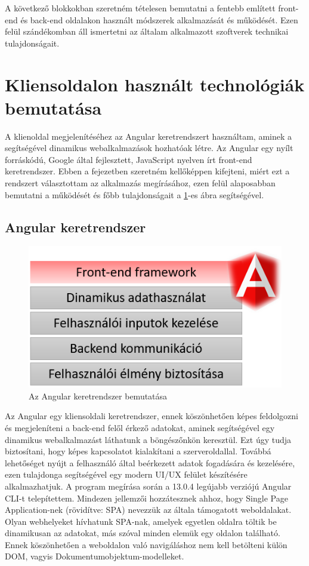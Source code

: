 \bigskip
A következő blokkokban szeretném tételesen bemutatni a fentebb említett front-end és back-end oldalakon használt módszerek alkalmazását és működését. Ezen felül szándékomban áll ismertetni az általam alkalmazott szoftverek technikai tulajdonságait.

\section{Kliensoldalon használt technológiák bemutatása}
A klienoldal megjelenítéséhez az Angular keretrendszert használtam, aminek a segítségével dinamikus webalkalmazások hozhatóak létre. Az Angular egy nyílt forráskódú, Google által fejlesztett, JavaScript nyelven írt front-end keretrendszer. Ebben a fejezetben szeretném kellőképpen kifejteni, miért ezt a rendszert választottam az alkalmazás megírásához, ezen felül alaposabban bemutatni a működését és főbb tulajdonságait a \ref{fig.picture-2}-es ábra segítségével. 

\subsection{Angular keretrendszer}

\begin{figure}[H]
	\centering
	\includegraphics[width=1.0\textwidth]{images/angular_bemutatas.png}
	\caption{Az Angular keretrendszer bemutatása}
	\label{fig.picture-2}
\end{figure}

Az Angular egy kliensoldali keretrendszer, ennek köszönhetően képes feldolgozni és megjeleníteni a back-end felől érkező adatokat, aminek segítségével egy dinamikus webalkalmazást láthatunk a böngészőnkön keresztül. Ezt úgy tudja biztosítani, hogy képes kapcsolatot kialakítani a szerveroldallal. Továbbá lehetőséget nyújt a felhasználó által beérkezett adatok fogadására és kezelésére, ezen tulajdonga segítségével egy modern UI/UX felület készítésére alkalmazhatjuk. A program megírása során a 13.0.4 legújabb verziójú Angular CLI-t telepítettem. Mindezen jellemzői hozzátesznek ahhoz, hogy Single Page Application-nek (rövidítve: SPA)\cite{spa} nevezzük az általa támogatott weboldalakat. Olyan webhelyeket hívhatunk SPA-nak, amelyek egyetlen oldalra töltik be dinamikusan az adatokat, más szóval minden elemük egy oldalon található. Ennek köszönhetően a weboldalon való navigáláshoz nem kell betölteni külön DOM, vagyis Dokumentumobjektum-modelleket.

